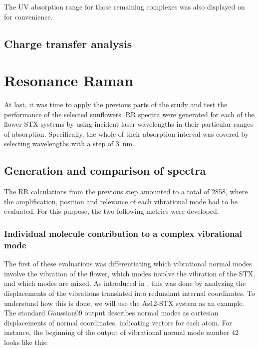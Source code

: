 The UV absorption range for those remaining complexes was also displayed on  for convenience.
\blindtext


\subsection{Charge transfer analysis}
\blindtext

\section{Resonance Raman}
At last, it was time to apply the previous parts of the study and test the performance of the selected sunflowers.
\blindtext
RR spectra were generated for each of the flower-STX systems by using incident laser wavelengths in their particular ranges of absorption.
Specifically, the whole of their absorption interval was covered by selecting wavelengths with a step of \SI{3}{\nano\metre}.
\blindtext

\subsection{Generation and comparison of spectra}
The RR calculations from the previous step amounted to a total of 2858, where the amplification, position and relevance of each vibrational mode had to be evaluated.
For this purpose, the two following metrics were developed.

\subsubsection{Individual molecule contribution to a complex vibrational mode}
The first of these evaluations was differentiating which vibrational normal modes involve the vibration of the flower, which modes involve the vibration of the STX, and which modes are mixed.
As introduced in , this was done by analyzing the displacements of the vibrations translated into redundant internal coordinates.
To understand how this is done, we will use the As12-STX system as an example.
The standard Gaussian09 output describes normal modes as cartesian displacements of normal coordinates, indicating vectors for each atom.
For instance, the beginning of the output of vibrational normal mode number 42 looks like this:

